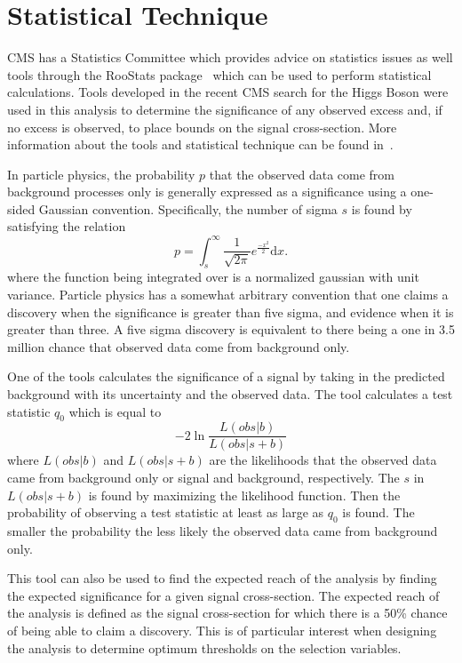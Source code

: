 \section{Statistical Technique \label{sec:stats}}
CMS has a Statistics Committee which provides advice on statistics issues as well tools through the RooStats package~\cite{Moneta:2010pm}
which can be used to perform statistical calculations.
Tools developed in the recent CMS search for the Higgs Boson were used
in this analysis to determine the significance of any observed excess and, if no excess is observed, to place bounds on the signal cross-section.
More information about the tools and statistical technique can be found in~\cite{Moneta:2010pm, Cowan:2010js, Chatrchyan:2013lba}.

In particle physics, the probability $p$ that the observed data come from background processes only is generally expressed
as a significance using a one-sided Gaussian convention. Specifically, the number of sigma $s$ is found by satisfying the relation
\begin{equation}
p = \int_s^{\infty} \frac{1}{\sqrt{2\pi}}e^{\frac{-x^2}{2}} \mathrm{d} x.
\label{eq:sigma}
\end{equation}
where the function being integrated over is a normalized gaussian with unit variance. Particle physics has a somewhat arbitrary
convention that one claims a discovery when the significance
is greater than five sigma, and evidence when it is greater than three. A five sigma discovery is equivalent to there being a one in 3.5 million chance that
observed data come from background only.

One of the tools calculates the significance of a signal by taking in the predicted background with its uncertainty and the observed data.
The tool calculates a test statistic $q_0$ which is equal to 
\begin{equation}
-2 \ln \frac{L(obs|b)}{L(obs|s+b)}
\label{eq:q0}
\end{equation}
where $L(obs|b)$ and $L(obs|s+b)$ are the likelihoods that the observed data came from background only or signal and background, respectively.
The $s$ in $L(obs|s+b)$ is found by maximizing the likelihood function. 
Then the probability of observing a test statistic at least as large as $q_0$ is found.
The smaller the probability the less likely the observed data came from background only.

This tool can also be used to find the expected reach of the analysis by finding the expected significance for a given signal cross-section.
The expected reach of the analysis is defined as the signal cross-section for which there is a 50\% chance of being able to claim a discovery.
This is of particular interest when designing the analysis to determine optimum thresholds on the selection variables.

